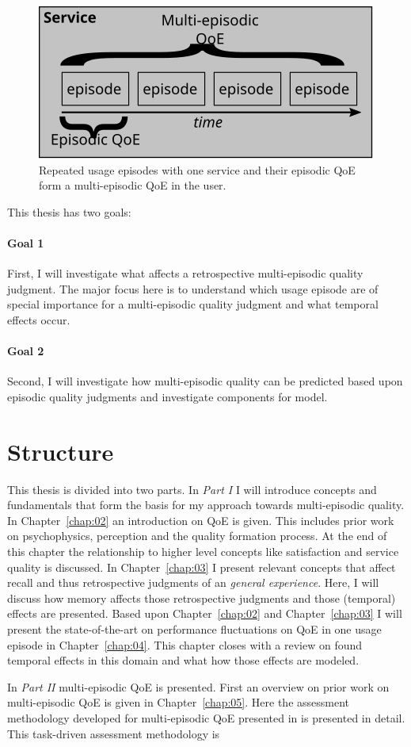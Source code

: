 \begin{figure}
	\centering
	\includegraphics[width=1\columnwidth]{fig/multi-episodic}
	\caption{Repeated usage episodes with one service and their episodic QoE form a multi-episodic QoE in the user.}
	\label{img:chap01:multi-episodic}
\end{figure}

This thesis has two goals:
\paragraph*{Goal 1}
First, I will investigate what affects a retrospective multi-episodic quality judgment.
The major focus here is to understand which usage episode are of special importance for a multi-episodic quality judgment and what temporal effects occur.

\paragraph*{Goal 2}
Second, I will investigate how multi-episodic quality can be predicted based upon episodic quality judgments and investigate components for model.

\section{Structure}
This thesis is divided into two parts.
In \emph{Part I} I will introduce concepts and fundamentals that form the basis for my approach towards multi-episodic quality.
In Chapter~\ref{chap:02} an introduction on \ac{QoE} is given.
This includes prior work on psychophysics, perception and the quality formation process.
At the end of this chapter the relationship to higher level concepts like satisfaction and service quality is discussed.
In Chapter~\ref{chap:03} I present relevant concepts that affect recall and thus retrospective judgments of an \emph{general experience}.
Here, I will discuss how memory affects those retrospective judgments and those (temporal) effects are presented.
Based upon Chapter~\ref{chap:02} and Chapter~\ref{chap:03} I will present the state-of-the-art on performance fluctuations on QoE in one usage episode in Chapter~\ref{chap:04}.
This chapter closes with a review on found temporal effects in this domain and what how those effects are modeled.

In \emph{Part II} multi-episodic QoE is presented.
First an overview on prior work on multi-episodic QoE is given in Chapter~\ref{chap:05}.
Here the assessment methodology developed for multi-episodic QoE presented in \cite{moller_single-call_2011} is presented in detail.
This task-driven assessment methodology is 																													